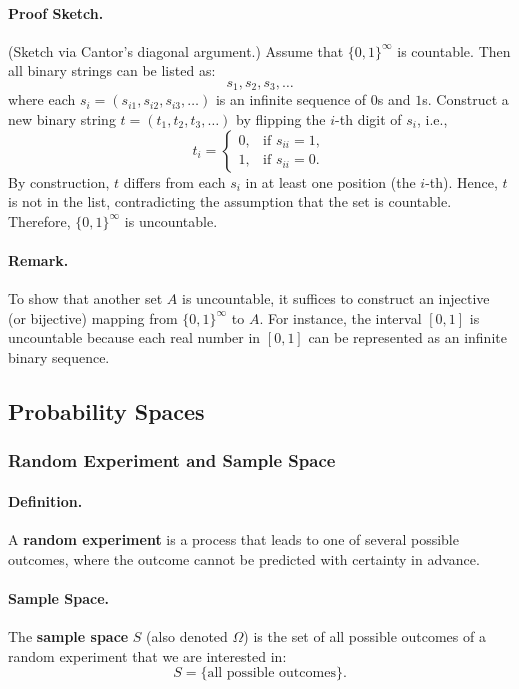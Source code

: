\paragraph{Proof Sketch.}
(Sketch via Cantor’s diagonal argument.)  
Assume that $\{0,1\}^{\infty}$ is countable. Then all binary strings can be listed as:
\[
s_1, s_2, s_3, \ldots
\]
where each $s_i = (s_{i1}, s_{i2}, s_{i3}, \ldots)$ is an infinite sequence of $0$s and $1$s.  
Construct a new binary string $t = (t_1, t_2, t_3, \ldots)$ by flipping the $i$-th digit of $s_i$, i.e.,
\[
t_i = 
\begin{cases}
0, & \text{if } s_{ii} = 1, \\
1, & \text{if } s_{ii} = 0.
\end{cases}
\]
By construction, $t$ differs from each $s_i$ in at least one position (the $i$-th).  
Hence, $t$ is not in the list, contradicting the assumption that the set is countable.  
Therefore, $\{0,1\}^{\infty}$ is uncountable.

\paragraph{Remark.}
To show that another set $A$ is uncountable, it suffices to construct an injective (or bijective) mapping from $\{0,1\}^{\infty}$ to $A$.  
For instance, the interval $[0,1]$ is uncountable because each real number in $[0,1]$ can be represented as an infinite binary sequence.


\subsection{Probability Spaces}

\subsubsection{Random Experiment and Sample Space}

\paragraph{Definition.}
A \textbf{random experiment} is a process that leads to one of several possible outcomes, where the outcome cannot be predicted with certainty in advance.

\paragraph{Sample Space.}
The \textbf{sample space} $S$ (also denoted $\Omega$) is the set of all possible outcomes of a random experiment that we are interested in:
\[
S = \{\text{all possible outcomes}\}.
\]

